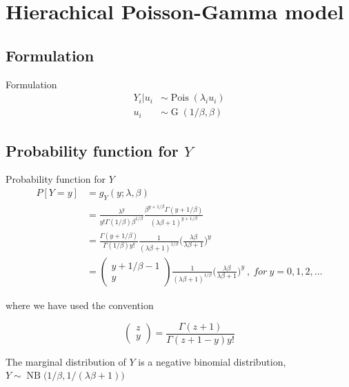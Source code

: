 \documentclass[aspectratio=169]{beamer}
\DeclareMathOperator{\G}{G}
\DeclareMathOperator{\NB}{NB}
\DeclareMathOperator{\Pois}{Pois}
\begin{document}
\hypertarget{hierachical-poisson-gamma-model}{%
\section{Hierachical Poisson-Gamma
model}\label{hierachical-poisson-gamma-model}}

\hypertarget{formulation}{%
\subsection{Formulation}\label{formulation}}

\begin{frame}{Formulation}
\begin{subequations} \label{eq:PoisGam}
  \begin{alignat}{2}
    Y_{i}|u_{i} &\sim \Pois (\lambda_{i} u_{i}) \label{eq:pois_g0} \\ 
    u_{i} &\sim \G(1/\beta,\beta) \label{eq:pois_g1}
  \end{alignat}
\end{subequations}
\end{frame}

\hypertarget{probability-function-for-y}{%
\subsection{\texorpdfstring{Probability function for
\(Y\)}{Probability function for Y}}\label{probability-function-for-y}}

\begin{frame}{Probability function for \(Y\)}
\begin{equation} \label{eq:pdfMix}
  \begin{aligned}
    P[Y=y]&=g_{Y}(y;\lambda, \beta) \\
    &=\frac{\lambda^{y}}{y!\Gamma(1/\beta)\beta^{1/\beta}}\frac{\beta^{y+1/\beta}\Gamma(y+1/\beta)}{(\lambda \beta + 1)^{y+1/\beta}} \\
    &=\frac{\Gamma(y+1/\beta)}{\Gamma(1/\beta)y!}\frac{1}{(\lambda\beta+1)^{1/\beta}}\bigg(\frac{\lambda\beta}{\lambda\beta+1}\bigg)^{y} \\
    &=\begin{pmatrix} y+1/\beta-1 \\ y \end{pmatrix} \frac{1}{(\lambda\beta+1)^{1/\beta}}\bigg(\frac{\lambda\beta}{\lambda\beta+1}\bigg)^{y} \ , \ for \ y = 0, 1, 2, \dots
  \end{aligned}
\end{equation}

where we have used the convention

\begin{equation}
  \begin{pmatrix} z\\y \end{pmatrix} = \frac{\Gamma(z+1)}{\Gamma(z+1-y)y!}
\end{equation}

The marginal distribution of \(Y\) is a negative binomial distribution,
\(Y\sim \NB\big(1/\beta,1/(\lambda \beta+1)\big)\)
\end{frame}
\end{document}
